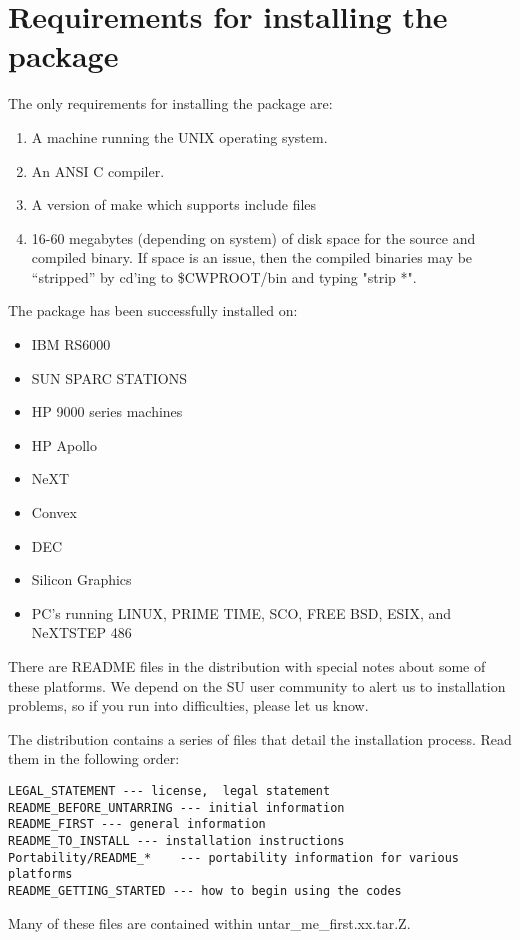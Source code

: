 {{{{{{{\section{Requirements for installing the package}
The only requirements for installing the package are:
\begin{enumerate}
\item A machine running the UNIX operating system.
\item An {\sf ANSI C} compiler.
\item A version of make which supports include files
\item 16-60 megabytes (depending on system) of disk space for
the source and compiled binary. If space is an issue, then the
compiled binaries may be ``stripped'' by cd'ing to \$CWPROOT/bin
and typing "strip *".
\end{enumerate}

\noindent
The package has been successfully installed on:
\begin{itemize}
\item IBM RS6000
\item SUN SPARC STATIONS
\item HP 9000 series machines
\item HP Apollo
\item NeXT
\item Convex
\item DEC
\item Silicon Graphics
\item PC's running LINUX, PRIME TIME, SCO, FREE BSD, ESIX, and NeXTSTEP 486
\end{itemize}

There are README files in the distribution with special notes about some
of these platforms.  We depend on the {\small\sf SU} user community to alert us to 
installation problems, so if you run into difficulties, please let us know.

The distribution contains a series of files that detail the installation 
process.  Read them in the following order:

{\small\begin{verbatim}
LEGAL_STATEMENT --- license,  legal statement
README_BEFORE_UNTARRING --- initial information
README_FIRST --- general information
README_TO_INSTALL --- installation instructions
Portability/README_*    --- portability information for various platforms
README_GETTING_STARTED --- how to begin using the codes
\end{verbatim}}\noindent
Many of these files are contained within untar\_me\_first.xx.tar.Z.

}}}}}}}
